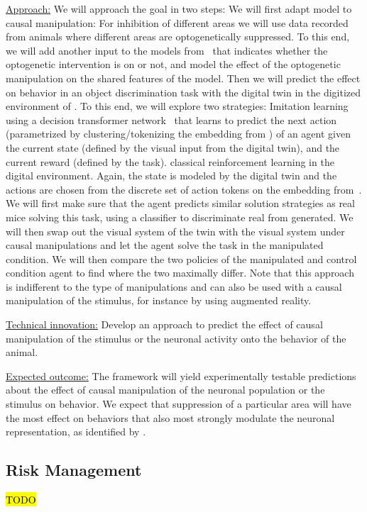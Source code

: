 \documentclass[COG,11pt]{ercgrant}
\begin{document}
\underline{Approach:} 
We will approach the goal in two steps:  We will first adapt model to causal manipulation: For inhibition of different areas we will use data recorded from animals where different areas are optogenetically suppressed.
To this end, we will add another input to the models from ~that indicates whether the optogenetic intervention is on or not, and model the effect of the optogenetic manipulation on the shared features of the model. 
Then we will predict the effect on behavior in an object discrimination task with the digital twin in the digitized environment of . 
To this end, we will explore two strategies:  Imitation learning using a decision transformer network~\parencite{Chen2021-ap} that learns to predict the next action (parametrized by clustering/tokenizing the embedding from ) of an agent given the current state (defined by the visual input from the digital twin), and the current reward (defined by the task).  classical reinforcement learning in the digital environment. 
Again, the state is modeled by the digital twin and the actions are chosen from the discrete set of action tokens on the embedding from~. 
We will first make sure that the agent predicts similar solution strategies as real mice solving this task, using a classifier to discriminate real from generated.
We will then swap out the visual system of the twin with the visual system under causal manipulations and let the agent solve the task in the manipulated condition. 
We will then compare the two policies of the manipulated and control condition agent to find where the two maximally differ. 
Note that this approach is indifferent to the type of manipulations and can also be used with a causal manipulation of the stimulus, for instance by using augmented reality. 

\underline{Technical innovation:} Develop an approach to predict the effect of causal manipulation of the stimulus or the neuronal activity onto the behavior of the animal. 

\underline{Expected outcome:} 
The framework will yield experimentally testable predictions about the effect of causal manipulation of the neuronal population or the stimulus on behavior. 
We expect that suppression of a particular area will have the most effect on behaviors that also most strongly modulate the neuronal representation, as identified by \objii. 

\subsection{Risk Management}
\hl{TODO}
\begin{small}
\printbibliography
\end{small}
\end{document}
